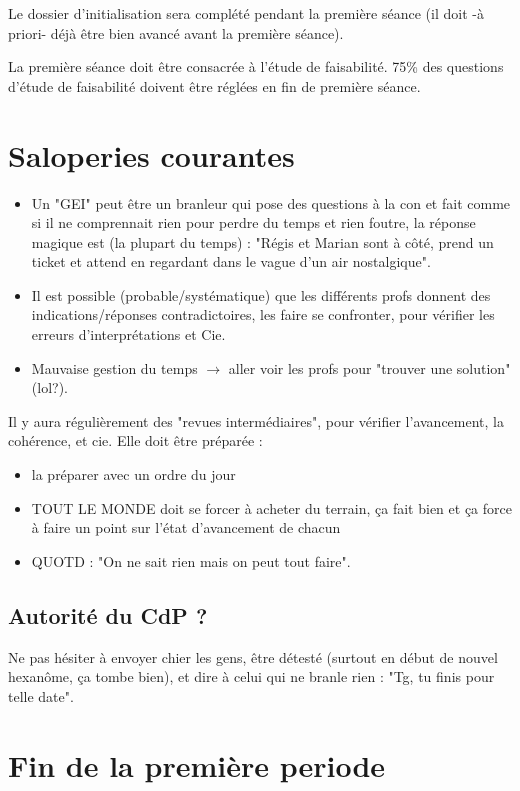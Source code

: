 Le dossier d'initialisation sera complété pendant la première séance (il doit
-à priori- déjà être bien avancé avant la première séance).

La première séance doit être consacrée à l'étude de faisabilité. 75\% des
questions d'étude de faisabilité doivent être réglées en fin de première
séance. 

\section{Saloperies courantes}

\begin{itemize}
	\item Un "GEI" peut être un branleur qui pose des questions à la con et
fait comme si il ne comprennait rien pour perdre du temps et rien foutre, la
réponse magique est (la plupart du temps) : "Régis et Marian sont à côté, prend
un ticket et attend en regardant dans le vague d'un air nostalgique".
	\item Il est possible (probable/systématique) que les différents profs
donnent des indications/réponses contradictoires, les faire se confronter, pour
vérifier les erreurs d'interprétations et Cie.
	\item Mauvaise gestion du temps $\rightarrow$ aller voir les profs pour
"trouver une solution" (lol?).
\end{itemize}

Il y aura régulièrement des "revues intermédiaires", pour vérifier
l'avancement, la cohérence, et cie. Elle doit être préparée :

\begin{itemize}
	\item la préparer avec un ordre du jour
	\item TOUT LE MONDE doit se forcer à acheter du terrain, ça fait bien et ça
force à faire un point sur l'état d'avancement de chacun
	\item QUOTD : "On ne sait rien mais on peut tout faire".
\end{itemize}

\subsection{Autorité du CdP ?}
Ne pas hésiter à envoyer chier les gens, être détesté (surtout en début de
nouvel hexanôme, ça tombe bien), et dire à celui qui ne branle rien : "Tg, tu
finis pour telle date".

\section{Fin de la première periode}

